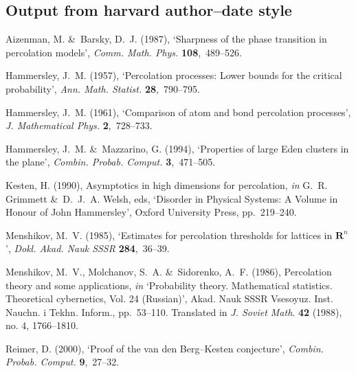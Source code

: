 \subsection*{Output from harvard author--date style}
\begin{harvardoutput}
\item Aizenman, M. \&\ Barsky, D.~J. (1987), `Sharpness of the phase transition in percolation models', {\em Comm. Math. Phys.} \textbf{108},~489--526.

\item Hammersley, J.~M. (1957), `Percolation processes: Lower bounds for the critical probability', {\em Ann. Math. Statist.} \textbf{28},~790--795.

\item Hammersley, J.~M. (1961), `Comparison of atom and bond percolation processes', {\em J. Mathematical Phys.} \textbf{2},~728--733.

\item Hammersley, J.~M. \&\ Mazzarino, G. (1994), `Properties of large Eden clusters in the plane', {\em Combin. Probab. Comput.} \textbf{3},~471--505.

\item Kesten, H. (1990), Asymptotics in high dimensions for percolation, {\em in} G.~R. Grimmett \&\ D.~J.~A. Welsh, eds, `Disorder in Physical Systems: A Volume in Honour of John Hammersley', Oxford University Press, pp.~219--240.

\item Menshikov, M.~V. (1985), `Estimates for percolation thresholds for lattices in $\textbf{R}^n$', {\em Dokl. Akad. Nauk SSSR} \textbf{284},~36--39.

\item Menshikov, M.~V., Molchanov, S.~A. \&\ Sidorenko, A.~F. (1986), Percolation theory and some applications, {\em in} `Probability theory. Mathematical statistics. Theoretical cybernetics, Vol. 24 (Russian)', Akad. Nauk SSSR Vsesoyuz. Inst. Nauchn. i Tekhn. Inform., pp.~53--110. Translated in {\em J. Soviet Math}. \textbf{42} (1988), no. 4, 1766--1810.

\item Reimer, D. (2000), `Proof of the van den Berg--Kesten conjecture', {\em Combin. Probab. Comput.} \textbf{9},~27--32.

\end{harvardoutput}

